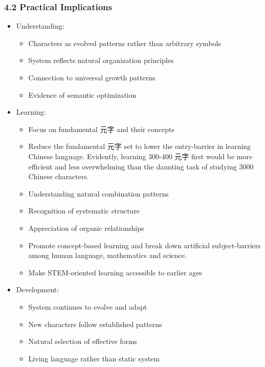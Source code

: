 \documentclass[
  11pt,
  letterpaper,
]{article}
\providecommand{\tightlist}{%
  \setlength{\itemsep}{0pt}\setlength{\parskip}{0pt}}
\begin{document}
\hypertarget{practical-implications}{%
\subsubsection{4.2 Practical
Implications}\label{practical-implications}}

\begin{itemize}
\tightlist
\item
  Understanding:

  \begin{itemize}
  \tightlist
  \item
    Characters as evolved patterns rather than arbitrary symbols
  \item
    System reflects natural organization principles
  \item
    Connection to universal growth patterns
  \item
    Evidence of semantic optimization
  \end{itemize}
\item
  Learning:

  \begin{itemize}
  \tightlist
  \item
    Focus on fundamental 元字 and their concepts
  \item
    Reduce the fundamental 元字 set to lower the entry-barrier in
    learning Chinese language. Evidently, learning 300-400 元字 first
    would be more efficient and less overwhelming than the daunting task
    of studying 3000 Chinese characters.
  \item
    Understanding natural combination patterns
  \item
    Recognition of systematic structure
  \item
    Appreciation of organic relationships
  \item
    Promote concept-based learning and break down artificial
    subject-barriers among human language, mathematics and science.
  \item
    Make STEM-oriented learning accessible to earlier ages
  \end{itemize}
\item
  Development:

  \begin{itemize}
  \tightlist
  \item
    System continues to evolve and adapt
  \item
    New characters follow established patterns
  \item
    Natural selection of effective forms
  \item
    Living language rather than static system
  \end{itemize}
\end{itemize}
\end{document}
